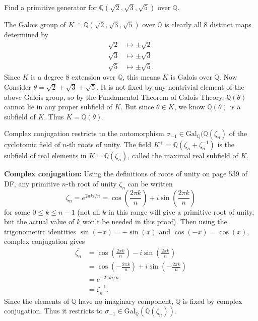 \documentclass[10pt]{report}
\begin{document}

\begin{exer}[14.4: 2]
	Find a primitive generator for $\mathbb{Q}(\sqrt{2} ,\sqrt{3} ,\sqrt{5} )$ over $\mathbb{Q}$.
\end{exer}
The Galois group of $K \doteq \mathbb{Q}(\sqrt{2} ,\sqrt{3} ,\sqrt{5} )$ over $\mathbb{Q}$ is clearly all 8 distinct maps determined by
\begin{align*}
	\sqrt{2} &\mapsto \pm \sqrt{2} \\
	\sqrt{3} &\mapsto \pm \sqrt{3} \\
	\sqrt{5} &\mapsto \pm \sqrt{5} .
\end{align*}
Since $K$ is a degree 8 extension over $\mathbb{Q}$, this means $K$ is Galois over $\mathbb{Q}$. Now Consider $\theta=\sqrt{2} +\sqrt{3} +\sqrt{5} $. It is not fixed by any nontrivial element of the above Galois group, so by the Fundamental Theorem of Galois Theory, $\mathbb{Q}(\theta)$ cannot lie in any proper subfield of $K$. But since $\theta \in K$, we know $\mathbb{Q}(\theta)$ is a subfield of $K$. Thus $K = \mathbb{Q}(\theta)$.

\pagebreak
\begin{exer}[14.5: 7]
	Complex conjugation restricts to the automorphism $\sigma_{-1} \in \text{Gal}_{\mathbb{Q}}(\mathbb{Q}(\zeta_{n})$ of the cyclotomic field of $n$-th roots of unity. The field $K^{+}=\mathbb{Q}(\zeta_{n}+\zeta_{n}^{-1})$ is the subfield of real elements in $K=\mathbb{Q}(\zeta_{n})$, called the maximal real subfield of $K$.
\end{exer}
\textbf{Complex conjugation:} Using the definitions of roots of unity on page 539 of DF, any primitive $n$-th root of unity $\zeta_{n}$ can be written
\[
	\zeta_{n} = e^{2\pi k i/ n} = \cos\left( \frac{2\pi k}{n} \right)+i \sin \left( \frac{2\pi k}{n}  \right)
\] for some $0 \leq k \leq n-1$ (not all $k$ in this range will give a primitive root of unity, but the actual value of $k$ won't be needed in this proof). Then using the trigonometirc identities $\sin(-x)=-\sin(x)$ and $\cos(-x)=\cos(x)$, complex conjugation gives
\begin{align*}
	\overline{\zeta_{n}} &= \cos\left( \frac{2\pi k}{n} \right)-i \sin \left( \frac{2\pi k}{n}  \right) \\
			     &= \cos\left( -\frac{2\pi k}{n} \right)+i \sin \left( -\frac{2\pi k}{n}  \right) \\
			     &= e^{-2\pi k i/ n} \\
			     &= \zeta_{n}^{-1}.
\end{align*}
Since the elements of $\mathbb{Q}$ have no imaginary component, $\mathbb{Q}$ is fixed by complex conjugation. Thus it restricts to $\sigma_{-1} \in \text{Gal}_{\mathbb{Q}}(\mathbb{Q}(\zeta_{n}))$.
\end{document}
